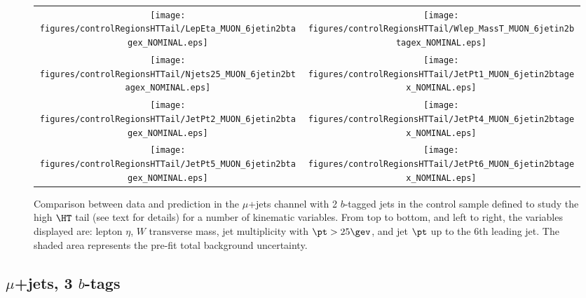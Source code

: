 \begin{figure}[htbp]
\begin{center}
\begin{tabular}{cc}
%
\texttt{[image: figures/controlRegionsHTTail/LepEta\_MUON\_6jetin2btagex\_NOMINAL.eps]} &
\texttt{[image: figures/controlRegionsHTTail/Wlep\_MassT\_MUON\_6jetin2btagex\_NOMINAL.eps]} \\
\texttt{[image: figures/controlRegionsHTTail/Njets25\_MUON\_6jetin2btagex\_NOMINAL.eps]} &
\texttt{[image: figures/controlRegionsHTTail/JetPt1\_MUON\_6jetin2btagex\_NOMINAL.eps]} \\
\texttt{[image: figures/controlRegionsHTTail/JetPt2\_MUON\_6jetin2btagex\_NOMINAL.eps]} &
\texttt{[image: figures/controlRegionsHTTail/JetPt4\_MUON\_6jetin2btagex\_NOMINAL.eps]} \\
\texttt{[image: figures/controlRegionsHTTail/JetPt5\_MUON\_6jetin2btagex\_NOMINAL.eps]} &
\texttt{[image: figures/controlRegionsHTTail/JetPt6\_MUON\_6jetin2btagex\_NOMINAL.eps]} \\
\end{tabular}\caption{\small {Comparison between data and prediction in the $\mu$+jets channel with 2 $b$-tagged jets in the control sample
defined to study the high $\HT$ tail (see text for details)  for a number of kinematic
variables. From top to bottom, and left to right, the variables displayed are: lepton $\eta$, $W$ transverse mass, jet multiplicity with $\pt>25\gev$, 
and jet $\pt$ up to the 6th leading jet.
The shaded area represents the pre-fit total background uncertainty.}}
\label{fig:MUON_controlHTTail_2btagex_2}
\end{center}
\end{figure}

\clearpage
\subsection{$\mu$+jets, 3 $b$-tags}
\label{sec:MUON_controlHTTail_3tagex}

